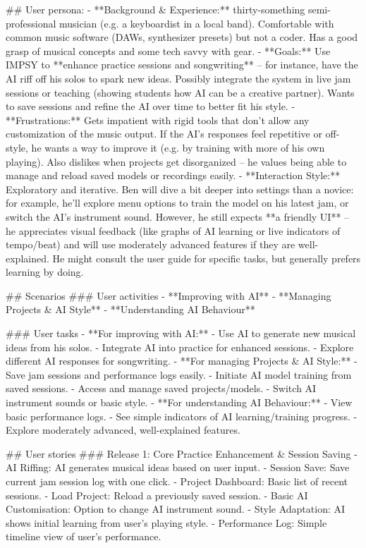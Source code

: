 ## User persona:
- **Background & Experience:** thirty-something semi-professional musician (e.g. a keyboardist in a local band). Comfortable with common music software (DAWs, synthesizer presets) but not a coder. Has a good grasp of musical concepts and some tech savvy with gear.
- **Goals:** Use IMPSY to **enhance practice sessions and songwriting** – for instance, have the AI riff off his solos to spark new ideas. Possibly integrate the system in live jam sessions or teaching (showing students how AI can be a creative partner). Wants to save sessions and refine the AI over time to better fit his style.
- **Frustrations:** Gets impatient with rigid tools that don’t allow any customization of the music output. If the AI’s responses feel repetitive or off-style, he wants a way to improve it (e.g. by training with more of his own playing). Also dislikes when projects get disorganized – he values being able to manage and reload saved models or recordings easily.
- **Interaction Style:** Exploratory and iterative. Ben will dive a bit deeper into settings than a novice: for example, he’ll explore menu options to train the model on his latest jam, or switch the AI’s instrument sound. However, he still expects **a friendly UI** – he appreciates visual feedback (like graphs of AI learning or live indicators of tempo/beat) and will use moderately advanced features if they are well-explained. He might consult the user guide for specific tasks, but generally prefers learning by doing.

## Scenarios
###  User activities
- **Improving with AI**
- **Managing Projects & AI Style**
- **Understanding AI Behaviour**

###  User tasks
- **For improving with AI:**
    -   Use AI to generate new musical ideas from his solos.
    -   Integrate AI into practice for enhanced sessions.
    -   Explore different AI responses for songwriting.
- **For managing Projects & AI Style:**
    -   Save jam sessions and performance logs easily.
    -   Initiate AI model training from saved sessions.
    -   Access and manage saved projects/models.
    -   Switch AI instrument sounds or basic style.
- **For understanding AI Behaviour:**
    -   View basic performance logs.
    -   See simple indicators of AI learning/training progress.
    -   Explore moderately advanced, well-explained features.

## User stories
###  Release 1: Core Practice Enhancement & Session Saving
- AI Riffing: AI generates musical ideas based on user input.
- Session Save: Save current jam session log with one click.
- Project Dashboard: Basic list of recent sessions.
- Load Project: Reload a previously saved session.
- Basic AI Customisation: Option to change AI instrument sound.
- Style Adaptation: AI shows initial learning from user's playing style.
- Performance Log: Simple timeline view of user's performance.

